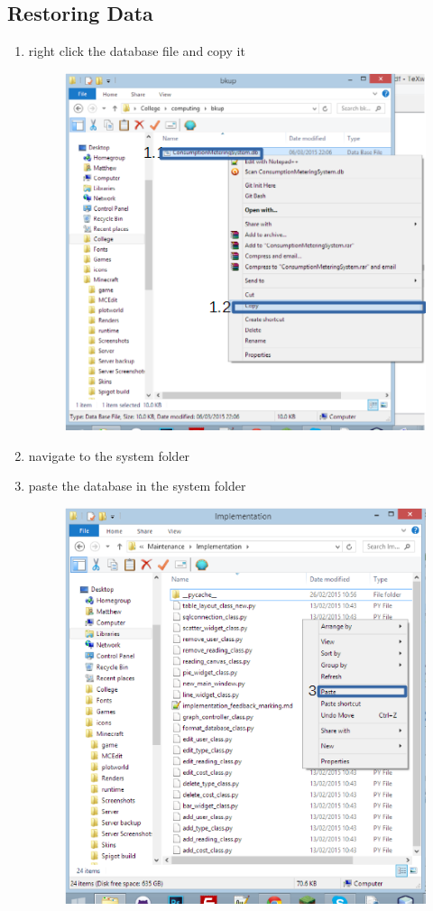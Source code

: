 \begin{enumerate}
\begin{figure}[H]
\end{figure}
\end{enumerate}
\subsection{Restoring Data}
\begin{enumerate}
	\item right click the database file and copy it
\begin{figure}[H]
	\includegraphics{./manual/images/restore-step-1.png}
\end{figure}
	\item navigate to the system folder
	\item paste the database in the system folder
\begin{figure}[H]
	\includegraphics{./manual/images/restore-step-3.png}
\end{figure}
\end{enumerate}

\stopcontents[chapters]